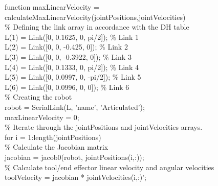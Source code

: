 \begin{algorithm}[H]
    function maxLinearVelocity = calculateMaxLinearVelocity(jointPositions,jointVelocities)\\
    \hspace{18pt} \% Defining the link array in accordance with the DH table\\
    \hspace{18pt} L(1) = Link([0, 0.1625, 0,  pi/2]); \% Link 1\\
    \hspace{18pt} L(2) = Link([0, 0, -0.425,  0]); \% Link 2\\
    \hspace{18pt} L(3) = Link([0,  0, -0.3922, 0]); \% Link 3\\
    \hspace{18pt} L(4) = Link([0, 0.1333, 0,  pi/2]); \% Link 4\\
    \hspace{18pt} L(5) = Link([0, 0.0997, 0,  -pi/2]); \% Link 5\\
    \hspace{18pt} L(6) = Link([0, 0.0996, 0,  0]); \% Link 6\\
    \hspace{18pt} \% Creating the robot\\
    \hspace{18pt} robot = SerialLink(L, 'name', 'Articulated');\\
    \hspace{18pt} maxLinearVelocity = 0;\\
    \hspace{18pt} \% Iterate through the jointPositions and jointVelocities arrays.\\
    \hspace{18pt}for i = 1:length(jointPositions)\\
    \hspace{18pt}    \hspace{18pt}\% Calculate the Jacobian matrix\\
    \hspace{18pt}    \hspace{18pt}jacobian = jacob0(robot, jointPositions(i,:));\\
    \hspace{18pt}    \hspace{18pt}\% Calculate tool/end effector linear velocity and angular velocities \\
    \hspace{18pt}    \hspace{18pt}toolVelocity = jacobian * jointVelocities(i,:)';\\

\end{algorithm}
